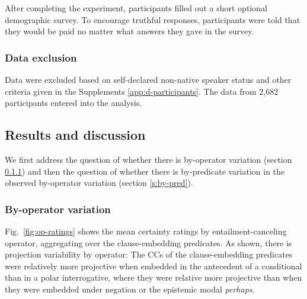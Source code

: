 \documentclass[a4paper,12pt,twoside]{article}
\newcommand{\posscite}[1]{\citeauthor{#1}'s (\citeyear{#1})}
\begin{document}
             After completing the experiment, participants filled out a short optional demographic survey. To encourage truthful responses, participants were told that they would be paid no matter what answers they gave in the survey.

        \subsubsection{Data exclusion}

        Data were excluded based on self-declared non-native speaker status and other criteria given in the Supplements \ref{app:d-participants}. The data from 2,682 participants entered into the analysis.  


    \subsection{Results and discussion}

    We first address the question of whether there is by-operator variation (section \ref{s:by-op}) and then the question of whether there is by-predicate variation in the observed by-operator variation (section \ref{s:by-pred}).
    
		
	\subsubsection{By-operator variation}\label{s:by-op}

        Fig.~\ref{fig:op-ratings} shows the mean certainty ratings by entailment-canceling operator, aggregating over the clause-embedding predicates. As shown, there is projection variability by operator: The CCs of the clause-embedding predicates were relatively more projective when embedded in the antecedent of a conditional than in a polar interrogative, where they were relative more projective than when they were embedded under negation or the epistemic modal {\em perhaps}.
  
\end{document}
